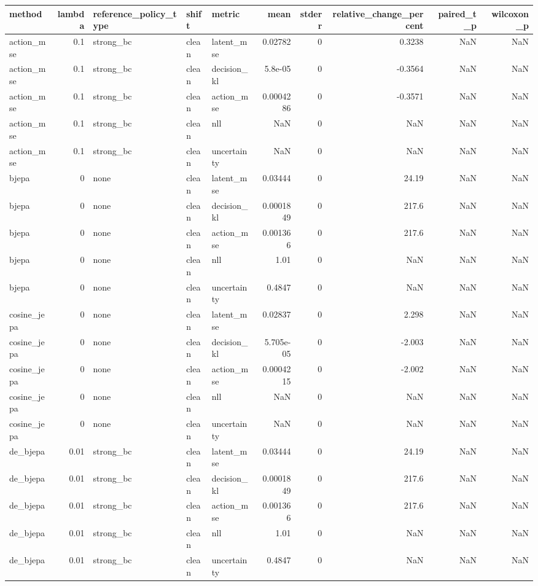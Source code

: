 \begin{tabular}{lrlllrrrrr}
\toprule
method & lambda & reference\_policy\_type & shift & metric & mean & stderr & relative\_change\_percent & paired\_t\_p & wilcoxon\_p \\
\midrule
action\_mse & 0.1 & strong\_bc & clean & latent\_mse & 0.02782 & 0 & 0.3238 & NaN & NaN \\
action\_mse & 0.1 & strong\_bc & clean & decision\_kl & 5.8e-05 & 0 & -0.3564 & NaN & NaN \\
action\_mse & 0.1 & strong\_bc & clean & action\_mse & 0.0004286 & 0 & -0.3571 & NaN & NaN \\
action\_mse & 0.1 & strong\_bc & clean & nll & NaN & 0 & NaN & NaN & NaN \\
action\_mse & 0.1 & strong\_bc & clean & uncertainty & NaN & 0 & NaN & NaN & NaN \\
bjepa & 0 & none & clean & latent\_mse & 0.03444 & 0 & 24.19 & NaN & NaN \\
bjepa & 0 & none & clean & decision\_kl & 0.0001849 & 0 & 217.6 & NaN & NaN \\
bjepa & 0 & none & clean & action\_mse & 0.001366 & 0 & 217.6 & NaN & NaN \\
bjepa & 0 & none & clean & nll & 1.01 & 0 & NaN & NaN & NaN \\
bjepa & 0 & none & clean & uncertainty & 0.4847 & 0 & NaN & NaN & NaN \\
cosine\_jepa & 0 & none & clean & latent\_mse & 0.02837 & 0 & 2.298 & NaN & NaN \\
cosine\_jepa & 0 & none & clean & decision\_kl & 5.705e-05 & 0 & -2.003 & NaN & NaN \\
cosine\_jepa & 0 & none & clean & action\_mse & 0.0004215 & 0 & -2.002 & NaN & NaN \\
cosine\_jepa & 0 & none & clean & nll & NaN & 0 & NaN & NaN & NaN \\
cosine\_jepa & 0 & none & clean & uncertainty & NaN & 0 & NaN & NaN & NaN \\
de\_bjepa & 0.01 & strong\_bc & clean & latent\_mse & 0.03444 & 0 & 24.19 & NaN & NaN \\
de\_bjepa & 0.01 & strong\_bc & clean & decision\_kl & 0.0001849 & 0 & 217.6 & NaN & NaN \\
de\_bjepa & 0.01 & strong\_bc & clean & action\_mse & 0.001366 & 0 & 217.6 & NaN & NaN \\
de\_bjepa & 0.01 & strong\_bc & clean & nll & 1.01 & 0 & NaN & NaN & NaN \\
de\_bjepa & 0.01 & strong\_bc & clean & uncertainty & 0.4847 & 0 & NaN & NaN & NaN \\

\end{tabular}

